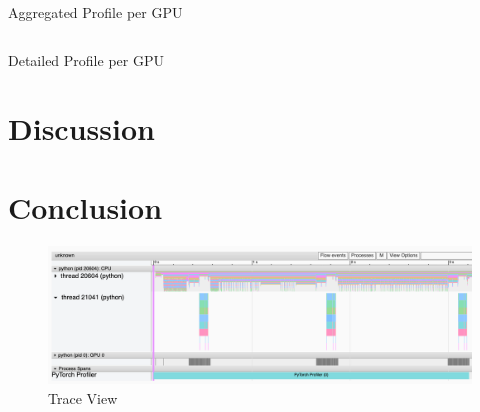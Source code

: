\documentclass[12pt, a4paper, hidelinks]{article}
\begin{document}
\begin{listing}[H]
\inputminted[xleftmargin=1em,linenos,fontsize=\scriptsize, firstline=18,lastline=31]{python}{./assets/scap_gtx1080_deepspeed_14615344_4294967294_one-epoch.txt}
\caption{Aggregated Profile per GPU}
\label{lst:scap_gtx1080_deepspeed_14615344_4294967294_one-epoch-aggregated}
\end{listing}

\begin{listing}[H]
\inputminted[xleftmargin=1em,linenos,fontsize=\tiny, firstline=33,lastline=48, breaklines]{python}{./assets/scap_gtx1080_deepspeed_14615344_4294967294_one-epoch.txt}
\caption{Detailed Profile per GPU}
\label{lst:scap_gtx1080_deepspeed_14615344_4294967294_one-epoch-detailed}
\end{listing}

\section{Discussion}
\label{sec:discussion}



\section{Conclusion}
\label{sec:conclusion}




\newpage
\printbibliography[heading=bibintoc]

\appendix
\break

\renewcommand*{\thepage}{A\arabic{page}}

\begin{figure}[H]
\centering
\includegraphics[width=1\textwidth]{./assets/scap_gtx1080_profiler-torch_batch-size-64_14650758_trace-view}
\caption*{Trace View}
\label{fig:scap_gtx1080_profiler-torch_batch-size-64_14650758_trace-view}
\end{figure}
\end{document}
